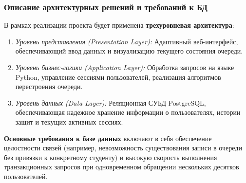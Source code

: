 \subsubsection{Описание архитектурных решений и требований к БД}

В рамках реализации проекта будет применена \textbf{трехуровневая архитектура}:

\begin{enumerate}
 \item \textit{Уровень представления (Presentation Layer):} Адаптивный веб-интерфейс, 
 обеспечивающий ввод данных и визуализацию текущего состояния очереди.
 \item \textit{Уровень бизнес-логики (Application Layer):} Обработка запросов на языке Python, 
 управление сессиями пользователей, реализация алгоритмов перестроения очереди.
 \item \textit{Уровень данных (Data Layer):} Реляционная СУБД PostgreSQL, обеспечивающая надежное 
 хранение информации о пользователях, истории защит и текущих активных сессиях.
\end{enumerate}

\textbf{Основные требования к базе данных} включают в себя обеспечение целостности связей 
(например, невозможность существования записи в очереди без привязки к конкретному студенту) и
 высокую скорость выполнения транзакционных запросов при одновременном обращении нескольких десятков пользователей.

